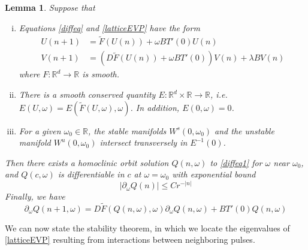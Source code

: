 \documentclass[12pt]{article}
\def\R{{\mathbb R}}
\newtheorem{lemma}{Lemma}
\begin{document}
\begin{lemma}\label{geneigcriteria}
Suppose that
\begin{enumerate}[(i)]
\item Equations \eqref{diffeq} and \eqref{latticeEVP} have the form
\begin{align}
U(n+1) &= \tilde{F}(U(n)) + \omega B T'(0) U(n) \label{diffeq1} \\
V(n+1) &= (D\tilde{F}(U(n)) + \omega B T'(0)) V(n) + \lambda B V(n) \label{latticeEVP1}
\end{align}
where $F: \R^d \rightarrow \R$ is smooth.
\item There is a smooth conserved quantity $E: \R^d \times \R \rightarrow \R$, i.e. $E(U, \omega) = E(\tilde{F}(U, \omega), \omega)$. In addition, $E(0, \omega) = 0$.  
\item For a given $\omega_0 \in \R$, the stable manifolds $W^s(0, \omega_0)$ and the unstable manifold $W^u(0, \omega_0)$ intersect transversely in $E^{-1}(0)$. 
\end{enumerate}
Then there exists a homoclinic orbit solution $Q(n, \omega)$ to \eqref{diffeq1} for $\omega$ near $\omega_0$, and $Q(c, \omega)$ is differentiable in $c$ at $\omega = \omega_0$ with exponential bound
\begin{equation}\label{Qomegabound}
|\partial_\omega Q(n)| \leq C r^{-|n|}
\end{equation}
Finally, we have
\begin{equation}\label{Qomegageneig}
\partial_\omega Q(n+1, \omega) = D\tilde{F}(Q(n, \omega), \omega)\partial_\omega Q(n, \omega)+ B T'(0)Q(n, \omega)
\end{equation}
\end{lemma}

We can now state the stability theorem, in which we locate the eigenvalues of \eqref{latticeEVP} resulting from interactions between neighboring pulses.
\end{document}
